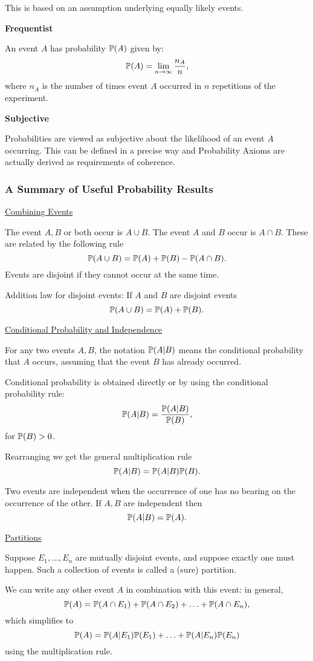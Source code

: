 \documentclass[10pt, a4paper]{article}
\begin{document}
This is based on an assumption underlying equally likely events.

\textbf{Frequentist}

An event $A$ has probability $\P(A)$ given by:
\[
\P(A) = \liminfty\frac{n_A}{n},
\]
where $n_A$ is the number of times event $A$ occurred in $n$ repetitions of the experiment.

\textbf{Subjective}

Probabilities are viewed as subjective about the likelihood of an event $A$ occurring.
This can be defined in a precise way and Probability Axioms are actually derived as requirements of coherence.

\subsubsection{A Summary of Useful Probability Results}
\underline{Combining Events}

The event $A, B$ or both occur is $A \cup B$.
The event $A$ and $B$ occur is $A \cap B$.
These are related by the following rule
\[
\P(A \cup B) = \P(A) + \P(B) - \P(A \cap B).
\]
Events are disjoint if they cannot occur at the same time.

Addition law for disjoint events:
If $A$ and $B$ are disjoint events
\[
\P(A \cup B) = \P(A) + \P(B).
\]

\underline{Conditional Probability and Independence}

For any two events $A, B$,
the notation $\P(A | B)$ means the conditional probability that $A$ occurs,
assuming that the event $B$ has already occurred.

Conditional probability is obtained directly or by using the conditional probability rule:
\[
\P(A | B) = \frac{\P(A | B)}{\P(B)},
\]
for $\P(B) > 0$.

Rearranging we get the general multiplication rule
\[
\P(A | B) = \P(A | B)\P(B).
\]

Two events are independent when the occurrence of one has no bearing on the occurrence of the other.
If $A, B$ are independent then
\[
\P(A | B) = \P(A).
\]

\underline{Partitions}

Suppose $E_1, \dotsc, E_n$ are mutually disjoint events,
and suppose exactly one must happen.
Such a collection of events is called a
(sure)
partition.

We can write any other event $A$ in combination with this event:
in general,
\[
\P(A) = \P(A \cap E_1) + \P(A \cap E_2) + \dotsc + \P(A \cap E_n),
\]
which simplifies to
\[
\P(A) = \P(A | E_1)\P(E_1) + \dotsc + \P(A | E_n)\P(E_n)
\]
using the multiplication rule.
\end{document}
